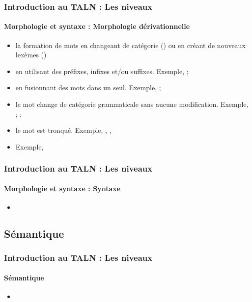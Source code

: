 \documentclass{beamer}
\begin{document}
\begin{frame}
\frametitle{Introduction au TALN : Les niveaux}
\framesubtitle{Morphologie et syntaxe : Morphologie dérivationnelle}

\begin{itemize}
	\item la formation de mots en changeant de catégorie () ou en créant de nouveaux lexèmes ()
	
	\item {} en utilisant des préfixes, infixes et/ou suffixes. 
	Exemple, ; 
	\item {} en fusionnant des mots  dans un seul. 
	Exemple, ; 
	
	\item {} le mot change de catégorie grammaticale sans aucune modification. 
	Exemple, ; ; 
	
	\item {} le mot est tronqué. 
	Exemple, , , 
	
	\item {} Exemple,  
	
\end{itemize}

\end{frame}

\begin{frame}
\frametitle{Introduction au TALN : Les niveaux}
\framesubtitle{Morphologie et syntaxe : Syntaxe}

\begin{itemize}
	\item 
\end{itemize}

\end{frame}

\subsection{Sémantique}

\begin{frame}
\frametitle{Introduction au TALN : Les niveaux}
\framesubtitle{Sémantique}

\begin{itemize}
	\item 
\end{itemize}

\end{frame}
\end{document}
